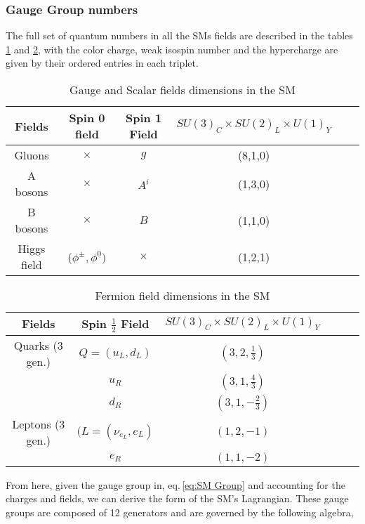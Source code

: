 
\subsubsection{Gauge Group numbers}

The full set of quantum numbers in all the SMs fields are described in the tables \ref{table1} and \ref{table2}, with the color charge, weak isospin number and the hypercharge are given by their ordered entries in each triplet.
%
\begin{table}[H]
\centering
\caption{Gauge and Scalar fields dimensions in the SM}
\label{table1}
\begin{tabular}{@{}cccccc@{}}
  \hline	
 Fields & Spin 0 field & Spin 1 Field & $SU(3)_C \times SU(2)_L \times U(1)_Y$  \\
  \hline	
 Gluons  & $\times$  & $g$ & (8,1,0) \\	
A bosons & $\times$  & $A^i$ & (1,3,0)   \\
B bosons & $\times$  & $B$ & (1,1,0)   \\
Higgs field & ($\phi^\pm, \phi^0 )$  & $\times$ & (1,2,1) \\ \hline
\end{tabular}
\end{table}
\begin{table}[H]
\centering
\caption{Fermion field dimensions in the SM}
\label{table2}
\begin{tabular}{@{}cccccc@{}}
  \hline	
 Fields & Spin $\frac{1}{2}$ Field & $SU(3)_C \times SU(2)_L \times U(1)_Y$  \\
  \hline	
Quarks (3 gen.) & $Q=(u_L,d_L)$ & $(3,2,\frac{1}{3})$ \\	
$\quad$        & $u_R$ & $(3,1,\frac{4}{3})$   \\
$\quad$   & $d_R$ & $(3,1, -\frac{2}{3})$   \\
Leptons (3 gen.) & $(L=(\nu_{e_L}, e_L )$ & $(1,2,-1)$  \\
$\quad$   & $e_R$ & $(1,1,-2)   $ \\ \hline

\end{tabular}
\end{table}
%
From here, given the gauge group in, eq.\,\ref{eq:SM Group} and accounting for the charges and fields, we can derive the form of the SM's Lagrangian. These gauge groups are composed of 12 generators and are governed by the following algebra, 
